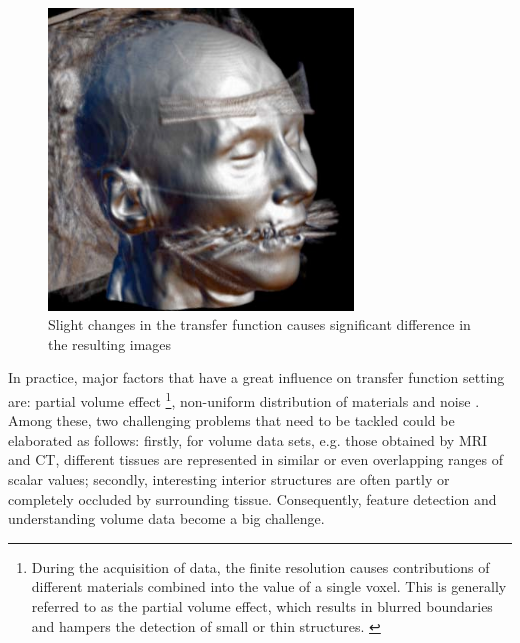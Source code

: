 \begin{figure}
\begin{minipage}{0.25\textwidth}
        \end{minipage}~
        ~ %
        \begin{minipage}{0.25\textwidth}
                \centering
                \includegraphics[width=1\linewidth]{images/glk_transfunction_2.png}
        \end{minipage}    
        \caption{Slight changes in the transfer function causes significant difference in the resulting images \cite{kindlmann_transfer_2002}}
        \label{fig:multiple_glk_transfunction}
\end{figure}

In practice, major factors that have a great influence on transfer function setting are: partial volume effect \footnote{During the acquisition of data, the finite resolution causes contributions of different materials combined into the value of a single voxel. This is generally referred to as the partial volume effect, which results in blurred boundaries and hampers the detection of small or thin structures. \cite{serlie_classifying_2007}}, non-uniform distribution of materials and noise \cite{serlie_computed_2003}.
Among these, two challenging problems that need to be tackled could be elaborated as follows: firstly, for volume data sets, e.g. those obtained by MRI and CT, different tissues are represented in similar or even overlapping ranges of scalar values; secondly, interesting interior structures are often partly or completely occluded by surrounding tissue.
Consequently, feature detection and understanding volume data become a big challenge.

